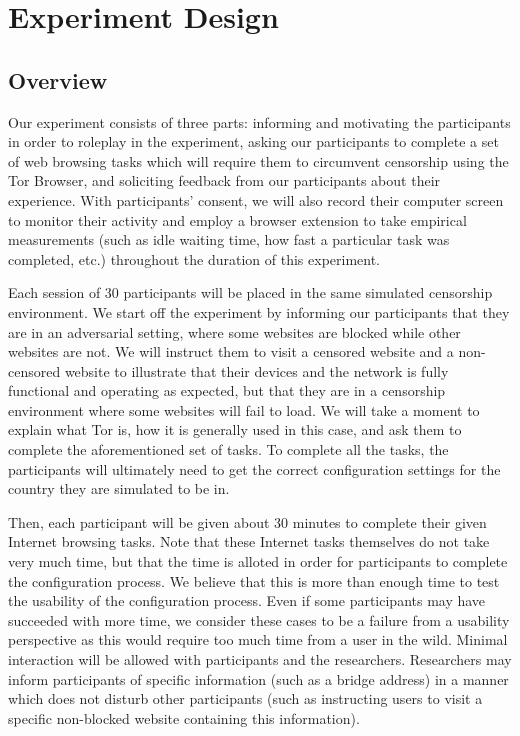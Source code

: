\documentclass[letterpaper,twocolumn,11pt]{article}
\begin{document}
\section{Experiment Design}

\subsection{Overview} 
Our experiment consists of three parts: informing and motivating the participants in order 
to roleplay in the experiment, asking our participants to complete a set of web browsing tasks which will 
require them to circumvent censorship using the Tor Browser, and soliciting feedback from our participants
about their experience. With participants' consent, we will also record their computer screen to monitor 
their activity and employ a browser extension to take empirical measurements (such as idle waiting time, 
how fast a particular task was completed, etc.) throughout the duration of this experiment. 

Each session of 30 participants will be placed in the same simulated censorship environment. 
We start off the experiment by informing our participants that they are in an adversarial setting, 
where some websites are blocked while other websites are not. We will instruct them to visit a censored
website and a non-censored website to illustrate that their devices and the network is fully functional and
operating as expected, but that they are in a censorship environment where some websites will fail to load. 
We will take a moment to explain what Tor is, how it is generally used in this case, and ask them to complete 
the aforementioned set of tasks. To complete all the tasks, the participants will ultimately need to get the correct
configuration settings for the country they are simulated to be in. 

Then, each participant will be given about 30 minutes to complete their given Internet browsing tasks. 
Note that these Internet tasks themselves do not take very much time, but that the time is alloted in order
for participants to complete the configuration process. We believe that this is more than enough time to 
test the usability of the configuration process. Even if some participants may have succeeded with more 
time, we consider these cases to be a failure from a usability perspective as this would require too much
time from a user in the wild. Minimal interaction will be allowed with participants and the researchers. 
Researchers may inform participants of specific information (such as a bridge address) in a manner 
which does not disturb other participants (such as instructing users to visit a specific non-blocked website 
containing this information). 
\end{document}
